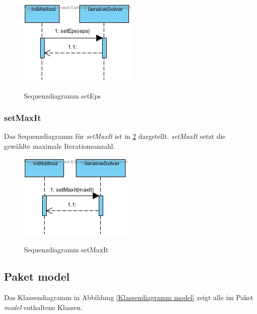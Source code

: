 \begin{figure}[H]
	\centering
	\includegraphics{Bilder/IterativeSolver__setEps().jpg}\\
	\caption{Sequenzdiagramm setEps}
	\label{Sequenzdiagramm setEps}
\end{figure}

\subsubsection*{setMaxIt}

Das Sequenzdiagramm für \emph{setMaxIt} ist in \ref{Sequenzdiagramm setMaxIt} dargstellt. \emph{setMaxIt} setzt die gewählte maximale Iterationsanzahl.

\begin{figure}[H]
	\centering
	\includegraphics{Bilder/IterativeSolver__setMaxIt().jpg}\\
	\caption{Sequenzdiagramm setMaxIt}
	\label{Sequenzdiagramm setMaxIt}
\end{figure}

\subsection{Paket model}

Das Klassendiagramm in Abbildung \ref{Klassendiagramm model} zeigt alle im Paket \emph{model} enthaltene Klassen.

